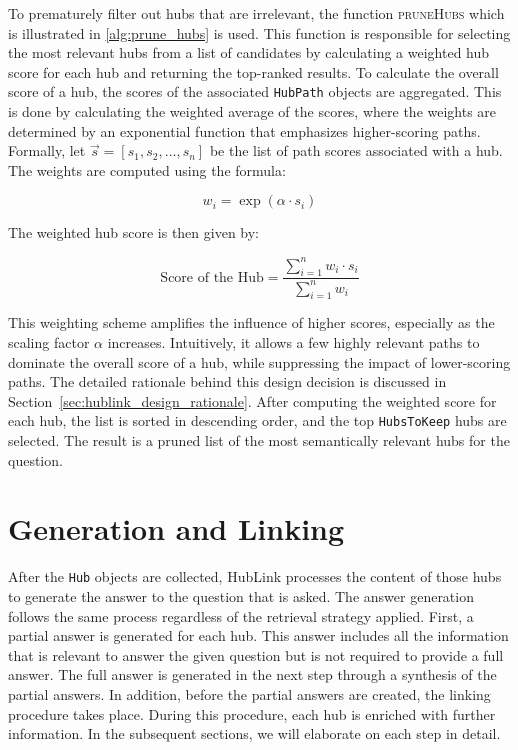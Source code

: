 To prematurely filter out hubs that are irrelevant, the function \textsc{pruneHubs} which is illustrated in \autoref{alg:prune_hubs} is used. This function is responsible for selecting the most relevant hubs from a list of candidates by calculating a weighted hub score for each hub and returning the top-ranked results. To calculate the overall score of a hub, the scores of the associated \texttt{HubPath} objects are aggregated. This is done by calculating the weighted average of the scores, where the weights are determined by an exponential function that emphasizes higher-scoring paths. Formally, let $\vec{s} = [s_1, s_2, \dots, s_n]$ be the list of path scores associated with a hub. The weights are computed using the formula:

\[
w_i = \exp(\alpha \cdot s_i)
\]

The weighted hub score is then given by:

\[
\text{Score of the Hub} = \frac{\sum_{i=1}^{n} w_i \cdot s_i}{\sum_{i=1}^{n} w_i}
\]

This weighting scheme amplifies the influence of higher scores, especially as the scaling factor $\alpha$ increases. Intuitively, it allows a few highly relevant paths to dominate the overall score of a hub, while suppressing the impact of lower-scoring paths. The detailed rationale behind this design decision is discussed in Section~\ref{sec:hublink_design_rationale}. After computing the weighted score for each hub, the list is sorted in descending order, and the top \texttt{HubsToKeep} hubs are selected. The result is a pruned list of the most semantically relevant hubs for the question.


\section{Generation and Linking}
\label{sec:hublink_answer_generation}

After the \texttt{Hub} objects are collected, HubLink processes the content of those hubs to generate the answer to the question that is asked. The answer generation follows the same process regardless of the retrieval strategy applied. First, a partial answer is generated for each hub. This answer includes all the information that is relevant to answer the given question but is not required to provide a full answer. The full answer is generated in the next step through a synthesis of the partial answers. In addition, before the partial answers are created, the linking procedure takes place. During this procedure, each hub is enriched with further information. In the subsequent sections, we will elaborate on each step in detail.


